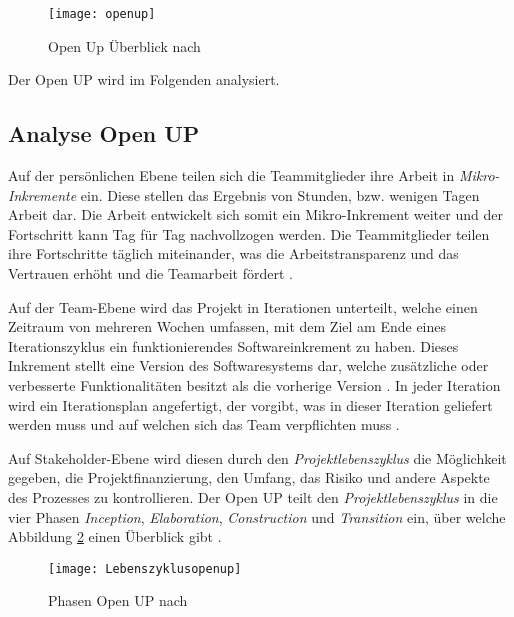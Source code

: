 \begin{figure}[htp]
\begin{center}
  \texttt{[image: openup]} %
  \caption{Open Up Überblick nach \cite{eclipseopenup}}
  \label{fig:openup}
\end{center}
\end{figure}

Der Open UP wird im Folgenden analysiert.

\subsection{Analyse Open UP}


Auf der persönlichen Ebene teilen sich die Teammitglieder ihre Arbeit in \textit{Mikro-Inkremente} ein. Diese stellen das Ergebnis von Stunden, bzw. wenigen Tagen Arbeit dar. Die Arbeit entwickelt sich somit ein Mikro-Inkrement weiter und der Fortschritt kann Tag für Tag nachvollzogen werden. Die Teammitglieder teilen ihre Fortschritte täglich miteinander, was die Arbeitstransparenz und das Vertrauen erhöht und die Teamarbeit fördert \cite{eclipseopenup}. \newline

Auf der Team-Ebene wird das Projekt in Iterationen unterteilt, welche einen Zeitraum von mehreren Wochen umfassen, mit dem Ziel am Ende eines Iterationszyklus ein funktionierendes Softwareinkrement zu haben. Dieses Inkrement stellt eine Version des Softwaresystems dar, welche zusätzliche oder verbesserte Funktionalitäten besitzt als die vorherige Version \cite{Basem2010}.  In jeder Iteration wird ein Iterationsplan angefertigt,  der vorgibt, was in dieser Iteration geliefert werden muss und auf welchen sich das Team verpflichten muss \cite{freudenreichevaluierung}.

Auf Stakeholder-Ebene wird diesen durch den \textit{Projektlebenszyklus} die Möglichkeit gegeben, die Projektfinanzierung, den Umfang, das Risiko und andere Aspekte des Prozesses zu kontrollieren.
Der Open UP teilt den \textit{Projektlebenszyklus} in die vier Phasen \textit{Inception}, \textit{Elaboration}, \textit{Construction} und \textit{Transition} ein, über welche Abbildung \ref{fig:Phasen} einen Überblick gibt \cite{eclipseopenup}.

\begin{figure}[htp]
\begin{center}
  \texttt{[image: Lebenszyklusopenup]} %
  \caption{Phasen Open UP nach \cite{eclipseopenup}}
  \label{fig:Phasen}
\end{center}
\end{figure}


